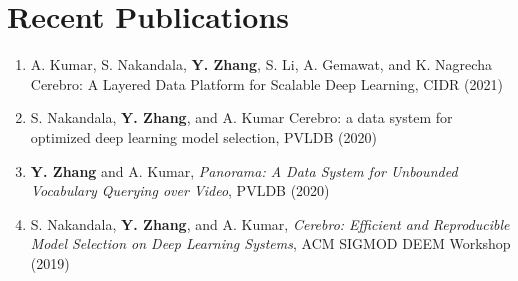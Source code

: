 \documentclass[letterpaper,11pt]{article}
\newcommand{\resumeSubHeadingListStart}{\begin{itemize}[leftmargin=*]}
\newcommand{\resumeSubHeadingListEnd}{\end{itemize}}
\begin{document}
\section{Recent Publications}
\footnotesize
\begin{enumerate}
\item A. Kumar, S. Nakandala, \textbf{Y. Zhang}, S. Li, A. Gemawat, and K. Nagrecha Cerebro: A Layered Data Platform for Scalable Deep Learning, CIDR (2021)
\item \textmd{S. Nakandala}, \textbf{Y. Zhang},\textmd{ and A. Kumar} Cerebro: a data system for optimized deep learning model selection, PVLDB (2020)\\
\item \textbf{Y. Zhang}\textmd{ and A. Kumar}, {\slshape Panorama: A Data System for Unbounded Vocabulary Querying over Video}, PVLDB (2020)\\
\item \textmd{S. Nakandala}, \textbf{Y. Zhang},\textmd{ and A. Kumar}, {\slshape Cerebro: Efficient and Reproducible Model Selection on Deep Learning Systems}, ACM SIGMOD DEEM Workshop (2019)\\
\end{enumerate}
%


\end{document}

